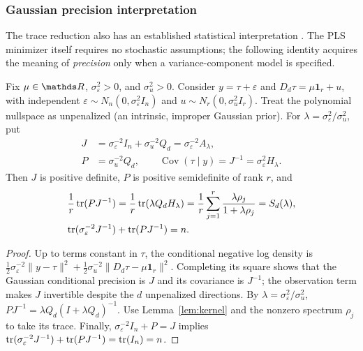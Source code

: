 \subsubsection{Gaussian precision interpretation}
The trace reduction also has an established statistical
interpretation \citep{guerrero2007,cortes2017}.
The PLS minimizer itself requires no stochastic assumptions;
the following identity acquires the meaning of \emph{precision}
only when a variance-component model is specified.

\begin{proposition}
\label{prop:precision-decomposition}
Fix $\mu\in\R$, $\sigma_\varepsilon^2>0$, and
$\sigma_u^2>0$. Consider
$y=\tau+\varepsilon$ and
$D_d\tau=\mu\mathbf1_r+u$, with independent
$\varepsilon\sim N_n(0,\sigma_\varepsilon^2I_n)$ and
$u\sim N_r(0,\sigma_u^2I_r)$.
Treat the polynomial nullspace as unpenalized
(an intrinsic, improper Gaussian prior).
For $\lambda=\sigma_\varepsilon^2/\sigma_u^2$, put
\begin{equation}\label{eq:precision-J}
\begin{aligned}
J&=\sigma_\varepsilon^{-2}I_n+
  \sigma_u^{-2}Q_d
 =\sigma_\varepsilon^{-2}A_\lambda,\\
P&=\sigma_u^{-2}Q_d,\qquad
\operatorname{Cov}(\tau\mid y)=J^{-1}
 =\sigma_\varepsilon^2H_\lambda .
\end{aligned}
\end{equation}
Then $J$ is positive definite, $P$ is
positive semidefinite of rank $r$, and
\begin{equation}\label{eq:precision-trace}
\begin{aligned}
\frac1r\operatorname{tr}(PJ^{-1})
&=\frac1r\operatorname{tr}(\lambda Q_dH_\lambda)
 =\frac1r\sum_{j=1}^r
   \frac{\lambda\rho_j}{1+\lambda\rho_j}
 =S_d(\lambda),\\
\operatorname{tr}(\sigma_\varepsilon^{-2}J^{-1})
 &+\operatorname{tr}(PJ^{-1})=n.
\end{aligned}
\end{equation}
\end{proposition}
\begin{proof}
Up to terms constant in $\tau$, the conditional negative
log density is
$\tfrac12\sigma_\varepsilon^{-2}\|y-\tau\|^2+
 \tfrac12\sigma_u^{-2}\|D_d\tau-\mu\mathbf1_r\|^2$.
Completing its square shows that the Gaussian
conditional precision is $J$ and its covariance
is $J^{-1}$; the observation term makes $J$
invertible despite the $d$ unpenalized directions.
By $\lambda=\sigma_\varepsilon^2/\sigma_u^2$,
$PJ^{-1}=\lambda Q_d(I+\lambda Q_d)^{-1}$.
Use Lemma~\ref{lem:kernel} and the nonzero spectrum
$\rho_j$ to take its trace. Finally,
$\sigma_\varepsilon^{-2}I_n+P=J$ implies
$\operatorname{tr}(\sigma_\varepsilon^{-2}J^{-1})
+\operatorname{tr}(PJ^{-1})=\operatorname{tr}(I_n)=n$.
\end{proof}

